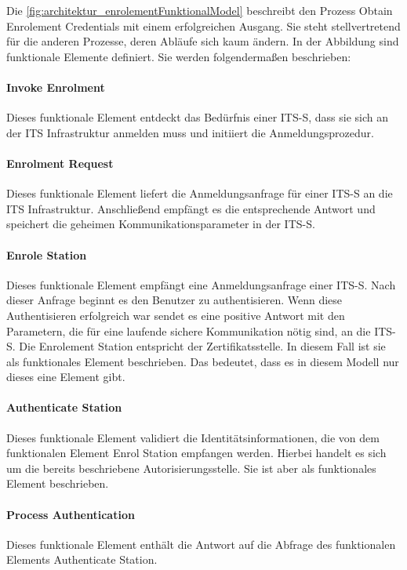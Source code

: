 Die \autoref{fig:architektur_enrolementFunktionalModel} beschreibt den Prozess Obtain Enrolement Credentials mit einem erfolgreichen Ausgang. Sie steht stellvertretend für die anderen Prozesse, deren Abläufe sich kaum ändern. In der Abbildung sind funktionale Elemente definiert. Sie werden folgendermaßen beschrieben:
\paragraph{Invoke Enrolment} Dieses funktionale Element entdeckt das Bedürfnis einer \ac{ITS-S}, dass sie sich an der \ac{ITS} Infrastruktur anmelden muss und initiiert die Anmeldungsprozedur.

\paragraph{Enrolment Request} Dieses funktionale Element liefert die Anmeldungsanfrage für einer \ac{ITS-S} an die \ac{ITS} Infrastruktur. Anschließend empfängt es die entsprechende Antwort und speichert die geheimen Kommunikationsparameter in der \ac{ITS-S}.


\paragraph{Enrole Station} Dieses funktionale Element empfängt eine Anmeldungsanfrage einer \ac{ITS-S}. Nach dieser Anfrage beginnt es den Benutzer zu authentisieren. Wenn diese Authentisieren erfolgreich war sendet es eine positive Antwort mit den Parametern, die für eine laufende sichere Kommunikation nötig sind, an die \ac{ITS-S}. Die Enrolement Station entspricht der Zertifikatsstelle. In diesem Fall ist sie als funktionales Element beschrieben. Das bedeutet, dass es in diesem Modell nur dieses eine Element gibt. 

\paragraph{Authenticate Station} Dieses funktionale Element validiert die Identitätsinformationen, die von dem funktionalen Element Enrol Station empfangen werden. Hierbei handelt es sich um die bereits beschriebene Autorisierungsstelle. Sie ist aber als funktionales Element beschrieben.

\paragraph{Process Authentication} Dieses funktionale Element enthält die Antwort auf die Abfrage des funktionalen Elements  Authenticate Station.
 
